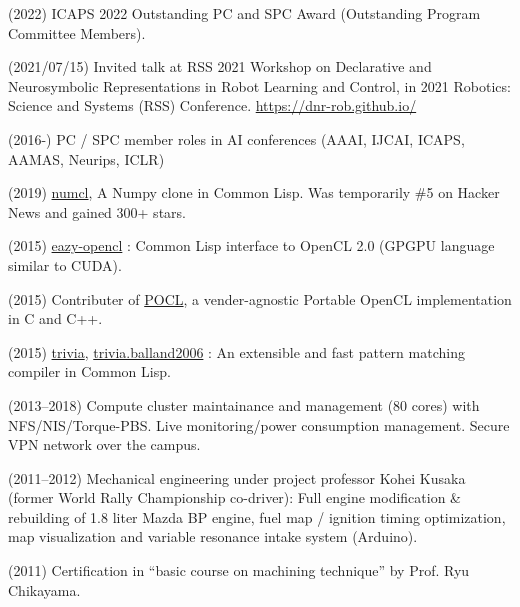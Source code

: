\documentclass[letterpaper,11pt]{article}
\begin{document}
(2022) ICAPS 2022 Outstanding PC and SPC Award (Outstanding Program Committee Members).


(2021/07/15) Invited talk at RSS 2021 Workshop on Declarative and Neurosymbolic Representations in Robot Learning and Control,
in 2021 Robotics: Science and Systems (RSS) Conference. \url{https://dnr-rob.github.io/}

(2016-) PC / SPC member roles in AI conferences (AAAI, IJCAI, ICAPS, AAMAS, Neurips, ICLR)

(2019) \href{https://github.com/numcl/numcl}{numcl},
A Numpy clone in Common Lisp. Was temporarily \#5 on Hacker News and gained 300+ stars.

(2015) \href{https://github.com/guicho271828/eazy-opencl}{eazy-opencl}
: Common Lisp interface to OpenCL 2.0 (GPGPU language similar to CUDA).

(2015) Contributer of \href{https://github.com/pocl/pocl}{POCL},
a vender-agnostic Portable OpenCL implementation in C and C++.

(2015) \href{https://github.com/guicho271828/trivia}{trivia},
\href{https://github.com/guicho271828/trivia.balland2006}{trivia.balland2006}
: An extensible and fast pattern matching compiler in Common Lisp.


(2013--2018)
 Compute cluster maintainance and management (80 cores) with NFS/NIS/Torque-PBS.
 Live monitoring/power consumption management.
 Secure VPN network over the campus.

(2011--2012) Mechanical engineering under project professor Kohei Kusaka (former World Rally
 Championship co-driver):
 Full engine modification \& rebuilding of 1.8 liter Mazda BP engine,
 fuel map / ignition timing optimization, map visualization and
 variable resonance intake system (Arduino).

(2011) Certification in ``basic course on machining technique'' by Prof. Ryu Chikayama.


\end{document}
